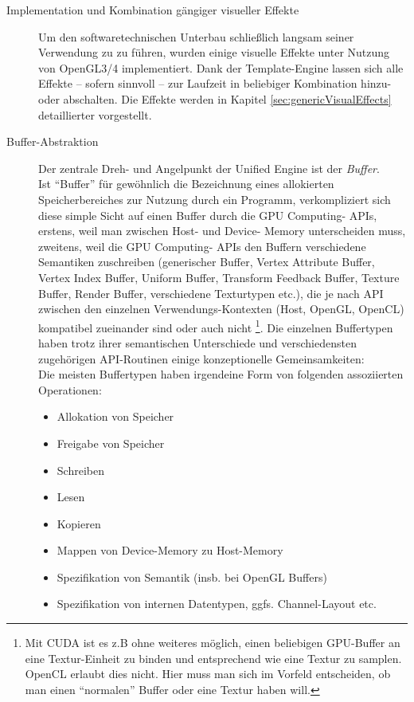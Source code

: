 \begin{description}
	
	\item[Implementation und Kombination gängiger visueller Effekte]
	Um den softwaretechnischen Unterbau schließlich langsam seiner Verwendung zu zu führen,
	wurden einige visuelle Effekte unter Nutzung von OpenGL3/4 implementiert.
	Dank der Template-Engine lassen sich alle Effekte -- sofern sinnvoll -- zur Laufzeit in beliebiger Kombination 
	hinzu- oder abschalten.
	Die Effekte werden in Kapitel \ref{sec:genericVisualEffects} detaillierter vorgestellt.
	

	\item[Buffer-Abstraktion]
	\label{overview:bufferAbstraction}
	Der zentrale Dreh- und Angelpunkt der Unified Engine ist der \emph{Buffer}.\\
	Ist "`Buffer"' für gewöhnlich die Bezeichnung eines allokierten Speicherbereiches zur Nutzung durch ein Programm,
	verkompliziert sich diese simple Sicht auf einen Buffer durch die GPU Computing- APIs, erstens, weil man zwischen
	Host- und Device- Memory unterscheiden muss, zweitens, weil die GPU Computing- APIs den Buffern verschiedene Semantiken
	zuschreiben (generischer Buffer, Vertex Attribute Buffer, Vertex Index Buffer, Uniform Buffer, 
	Transform Feedback Buffer, Texture Buffer, Render Buffer, verschiedene Texturtypen etc.), 
	die je nach API zwischen den einzelnen Verwendungs-Kontexten (Host, OpenGL, OpenCL) 
	kompatibel zueinander sind oder auch nicht
	\footnote{Mit CUDA ist es z.B ohne weiteres möglich, einen beliebigen GPU-Buffer an eine Textur-Einheit zu binden und 	
	entsprechend wie eine Textur zu samplen. OpenCL erlaubt dies nicht. Hier muss man sich im Vorfeld 
	entscheiden, ob man einen "`normalen"' Buffer oder eine Textur haben will.}.
	Die einzelnen Buffertypen haben trotz ihrer semantischen Unterschiede und verschiedensten zugehörigen API-Routinen
	einige konzeptionelle Gemeinsamkeiten:\\
	Die meisten Buffertypen haben irgendeine Form von folgenden assoziierten Operationen:
	\begin{itemize}
		\item Allokation von Speicher
		\item Freigabe von Speicher
		\item Schreiben
		\item Lesen
		\item Kopieren
		\item Mappen von Device-Memory zu Host-Memory
		\item Spezifikation von Semantik (insb. bei OpenGL Buffers)
		\item Spezifikation von internen Datentypen, ggfs. Channel-Layout etc.

\end{itemize}
\end{description}
